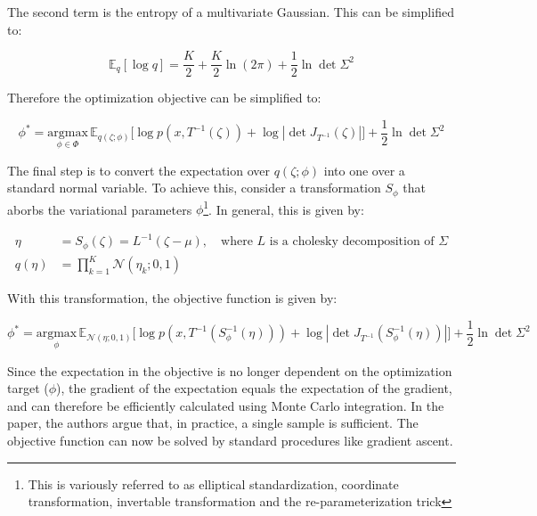 \documentclass[10pt]{article}
\begin{document}
The second term is the entropy of a multivariate Gaussian. This can be simplified to:

\begin{equation*}
  \mathbb{E}_q[\log q] = \frac{K}{2} + \frac{K}{2}\ln(2\pi) + \frac{1}{2}\ln\det \Sigma^2
\end{equation*}

Therefore the optimization objective can be simplified to:

\begin{equation*}
  \phi^* = \underset{\phi \in \Phi}{\text{argmax}} \, \mathbb{E}_{q(\zeta; \phi)}\big[\log p(x, T^{-1}(\zeta)) + \log |\det J_{T^{-1}}(\zeta)|\big] + \frac{1}{2}\ln \det \Sigma ^ 2
\end{equation*}


The final step is to convert the expectation over $q(\zeta; \phi)$ into one over a standard normal variable. To achieve
this, consider a transformation $S_{\phi}$ that aborbs the variational parameters $\phi$\footnote{This is variously 
referred to as elliptical standardization, coordinate transformation, invertable transformation and the re-parameterization
trick}. In general, this is given by:

\begin{align*}
  \eta &= S_{\phi}(\zeta) = L^{-1} (\zeta - \mu), \quad \text{where $L$ is a cholesky decomposition of $\Sigma$} \\
  q(\eta) &= \prod_{k=1}^{K}\mathcal{N}(\eta_k; 0, 1)
\end{align*}


With this transformation, the objective function is given by:

\begin{equation*}
  \phi^* = \underset{\phi}{\text{argmax}} \, \mathbb{E}_{\mathcal{N}(\eta; 0, 1)}\big[\log p(x, T^{-1}(S_\phi^{-1}(\eta))) + \log |\det J_{T^{-1}}(S_\phi^{-1}(\eta))|\big] + \frac{1}{2}\ln \det \Sigma ^ 2
\end{equation*}

Since the expectation in the objective is no longer dependent on the optimization target ($\phi$), the gradient of the expectation
equals the expectation of the gradient, and can therefore be efficiently calculated using Monte Carlo integration. In the paper, 
the authors argue that, in practice, a single sample is sufficient. The objective function can now be solved by standard procedures
like gradient ascent. 
\end{document}
